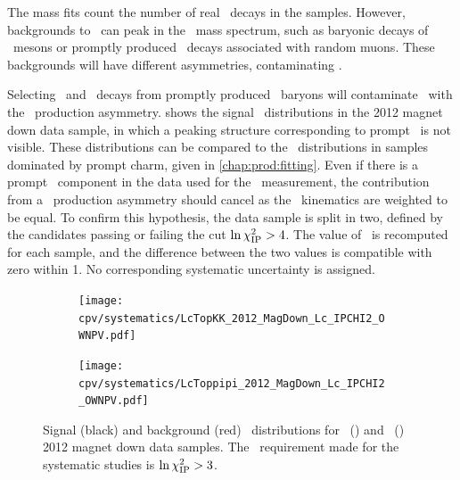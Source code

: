 The mass fits count the number of real \PLambdac\ decays in the samples.
However, backgrounds to \LbToLcmuX\ can peak in the \PLambdac\ mass spectrum,
such as baryonic decays of \PB\ mesons or promptly produced \PLambdac\ decays
associated with random muons.
These backgrounds will have different asymmetries, contaminating \dACP\@.

Selecting \pKK\ and \ppipi\ decays from promptly produced \PLambdac\ baryons
will contaminate \dACP\ with the \PLambdac\ production asymmetry.
 shows the signal \lnipchisq\ distributions in the
2012 magnet down data sample, in which a peaking structure corresponding to
prompt \PLambdac\ is not visible.
These distributions can be compared to the \lnipchisq\ distributions in samples
dominated by prompt charm, given in \cref{chap:prod:fitting}.
Even if there is a prompt \PLambdac\ component in the data used for the \dACP\
measurement, the contribution from a \PLambdac\ production asymmetry should
cancel as the \PLambdac\ kinematics are weighted to be equal.
To confirm this hypothesis, the data sample is split in two, defined by the
candidates passing or failing the cut $\ln\chi^2_{\textnormal{IP}} > 4$.
The value of \dACP\ is recomputed for each sample, and the difference between
the two values is compatible with zero within \SI{1}{\sigma}.
No corresponding systematic uncertainty is assigned.

\begin{figure}
  \begin{subfigure}[b]{0.5\textwidth}
    \texttt{[image: cpv/systematics/LcTopKK\_2012\_MagDown\_Lc\_IPCHI2\_OWNPV.pdf]}
    \caption{\pKK}
    \label{fig:cpv:syst:ipchisq:pKK}
  \end{subfigure}
  \begin{subfigure}[b]{0.5\textwidth}
    \texttt{[image: cpv/systematics/LcToppipi\_2012\_MagDown\_Lc\_IPCHI2\_OWNPV.pdf]}
    \caption{\ppipi}
    \label{fig:cpv:syst:ipchisq:ppipi}
  \end{subfigure}
  \caption{%
    Signal (black) and background (red) \lnipchisq\ distributions for
    \pKK~(\subref*{fig:cpv:syst:ipchisq:pKK}) and
    \ppipi~() 2012 magnet down data
    samples.
    The \lnipchisq\ requirement made for the systematic studies is $\ln\chi^2_{\textnormal{IP}}
    > 3$.
  }
  \label{fig:cpv:syst:ipchisq}
\end{figure}


